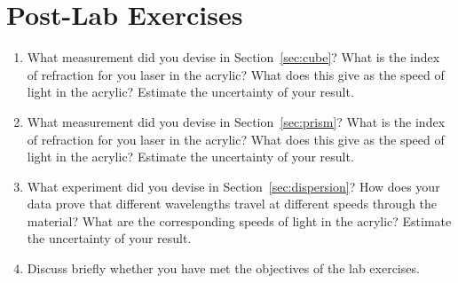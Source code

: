 \documentclass[12pt]{article}
\begin{document}
\newpage

\section*{Post-Lab Exercises}

\begin{enumerate}
\item What measurement did you devise in Section~\ref{sec:cube}?  What
  is the index of refraction for you laser in the acrylic?  What does
  this give as the speed of light in the acrylic?  Estimate the
  uncertainty of your result.
\item What measurement did you devise in Section~\ref{sec:prism}?
  What is the index of refraction for you laser in the acrylic?  What
  does this give as the speed of light in the acrylic?  Estimate the
  uncertainty of your result.
\item What experiment did you devise in Section~\ref{sec:dispersion}?
  How does your data prove that different wavelengths travel at
  different speeds through the material?  What are the corresponding
  speeds of light in the acrylic?  Estimate the uncertainty of your
  result.
\item Discuss briefly whether you have met the objectives of the lab
  exercises.
\end{enumerate}
\end{document}
